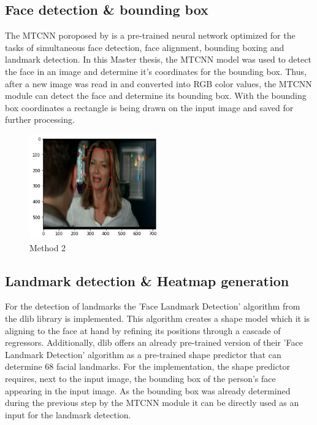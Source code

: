 \subsection{Face detection \& bounding box}
The \gls{MTCNN} poroposed by \citet{Zhang:2016:MTCCN} is a pre-trained neural network optimized for the tasks of simultaneous face detection, face alignment, bounding boxing and landmark detection.\citep{Brownlee:2019:VggFace2HowToFaceRec}
\newline\newline
In this Master thesis, the \gls{MTCNN} model was used to detect the face in an image and determine it's coordinates for the bounding box. Thus, after a new image was read in and converted into RGB color values, the \gls{MTCNN} module can detect the face and determine its bounding box. With the bounding box coordinates a rectangle is being drawn on the input image and saved for further processing.

\begin{center}
\begin{figure}[H]
  \begin{center}
  \includegraphics[angle=0, width=0.5\textwidth]{Figures/method_2.png}
  \caption{Method 2}
  \label{fig:MachineLearningModelMethod_2}
  \end{center}
\end{figure}
\end{center}

\subsection{Landmark detection \& Heatmap generation}
For the detection of landmarks the 'Face Landmark Detection' algorithm from the dlib library is implemented. This algorithm creates a shape model which it is aligning to the face at hand by refining its positions through a cascade of regressors. Additionally, dlib offers an already pre-trained version of their 'Face Landmark Detection' algorithm as a pre-trained shape predictor that can determine 68 facial landmarks.\citep{Kazemi:2014:ShapePredictor}
\newline\newline
For the implementation, the shape predictor requires, next to the input image, the bounding box of the person's face appearing in the input image. As the bounding box was already determined during the previous step by the \gls{MTCNN} module it can be directly used as an input for the landmark detection. \citep{Datahacker:2020:DlibFacialLandmarks}
\newline\newline

